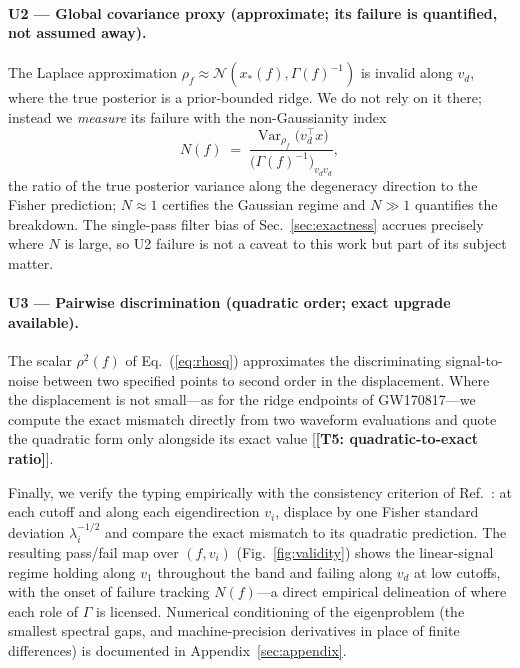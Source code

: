 \documentclass[twocolumn,prd,showpacs,superscriptaddress]{revtex4-2}
\newcommand{\Var}{\operatorname{Var}}
\newcommand{\vd}{v_{d}}          %
\newcommand{\rhosq}{\rho^{2}}    %
\newcommand{\figref}[1]{Fig.~\ref{fig:#1}}
\newcommand{\secref}[1]{Sec.~\ref{sec:#1}}
\newcommand{\eqnref}[1]{Eq.~(\ref{eq:#1})}
\newcommand{\manifest}[1]{\textbf{[#1]}}
\begin{document}
\paragraph{U2 --- Global covariance proxy (approximate; its failure is
quantified, not assumed away).}
The Laplace approximation
$\rho_f \approx \mathcal{N}(x_{*}(f), \Gamma(f)^{-1})$ is invalid along
$\vd$, where the true posterior is a prior-bounded ridge.  We do not
rely on it there; instead we \emph{measure} its failure with the
non-Gaussianity index
\begin{equation}
N(f) \;=\;
\frac{\Var_{\rho_f}\!\bigl(\vd^{\top} x\bigr)}
{\bigl(\Gamma(f)^{-1}\bigr)_{\vd\vd}} ,
\label{eq:ngauss}
\end{equation}
the ratio of the true posterior variance along the degeneracy direction
to the Fisher prediction; $N \approx 1$ certifies the Gaussian regime
and $N \gg 1$ quantifies the breakdown.  The single-pass filter bias of
\secref{exactness} accrues precisely where $N$ is large, so U2 failure
is not a caveat to this work but part of its subject matter.

\paragraph{U3 --- Pairwise discrimination (quadratic order; exact
upgrade available).}
The scalar $\rhosq(f)$ of \eqnref{rhosq} approximates the discriminating
signal-to-noise between two specified points to second order in the
displacement.  Where the displacement is not small---as for the ridge
endpoints of GW170817---we compute the exact mismatch directly from
two waveform evaluations and quote the quadratic form only alongside
its exact value [\manifest{T5: quadratic-to-exact ratio}].

Finally, we verify the typing empirically with the consistency
criterion of Ref.~\cite{vallisneri2008fisher}: at each cutoff and along
each eigendirection $v_i$, displace by one Fisher standard deviation
$\lambda_i^{-1/2}$ and compare the exact mismatch to its quadratic
prediction.  The resulting pass/fail map over $(f, v_i)$
(\figref{validity}) shows the linear-signal regime holding along $v_1$
throughout the band and failing along $\vd$ at low cutoffs, with the
onset of failure tracking $N(f)$---a direct empirical delineation of
where each role of $\Gamma$ is licensed.  Numerical conditioning of the
eigenproblem (the smallest spectral gaps, and machine-precision
derivatives in place of finite differences) is documented in
Appendix~\ref{sec:appendix}.
\end{document}
